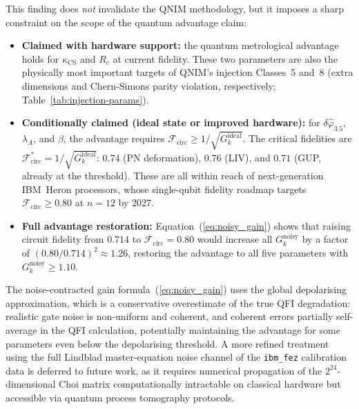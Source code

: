 \documentclass[11pt,a4paper, english]{book}
\theoremstyle{plain}
\theoremstyle{definition}
\numberwithin{equation}{chapter}
\numberwithin{figure}{chapter}
\numberwithin{table}{chapter}
\begin{document}
This finding does \emph{not} invalidate the QNIM methodology, but it
imposes a sharp constraint on the scope of the quantum advantage
claim:
\begin{itemize}
  \item \textbf{Claimed with hardware support:} the quantum metrological
        advantage holds for $\kappa_\mathrm{CS}$ and $R_c$ at current
        fidelity.  These two parameters are also the physically most
        important targets of QNIM's injection Classes~5 and~8 (extra dimensions 
and Chern-Simons parity violation, respectively; 
Table~\ref{tab:injection-params}).

  \item \textbf{Conditionally claimed (ideal state or improved hardware):}
        for $\delta\hat{\varphi}_{3.5}$, $\lambda_A$, and $\beta$, the
        advantage requires $\mathcal{F}_\mathrm{circ} \geq
        1/\sqrt{G_k^\mathrm{ideal}}$.  The critical fidelities are
        $\mathcal{F}_\mathrm{circ}^* = 1/\sqrt{G_k^\mathrm{ideal}}$:
        $0.74$ (PN deformation), $0.76$ (LIV), and $0.71$ (GUP,
        already at the threshold).  These are all within reach of
        next-generation IBM~Heron processors, whose single-qubit fidelity
        roadmap targets $\mathcal{F}_\mathrm{circ} \geq 0.80$ at
        $n=12$ by 2027.

  \item \textbf{Full advantage restoration:}
        Equation~(\ref{eq:noisy_gain}) shows that raising circuit
        fidelity from $0.714$ to $\mathcal{F}_\mathrm{circ} = 0.80$
        would increase all $G_k^\mathrm{noisy}$ by a factor of
        $(0.80/0.714)^2 \approx 1.26$, restoring the advantage to all
        five parameters with $G_k^\mathrm{noisy} \geq 1.10$.
\end{itemize}

The noise-contracted gain formula~(\ref{eq:noisy_gain}) uses the global
depolarising approximation, which is a conservative overestimate of the
true QFI degradation: realistic gate noise is non-uniform and coherent,
and coherent errors partially self-average in the QFI calculation,
potentially maintaining the advantage for some parameters even below
the depolarising threshold.  A more refined treatment using the full
Lindblad master-equation noise channel of the \texttt{ibm\_fez}
calibration data is deferred to future work, as it requires numerical
propagation of the $2^{24}$-dimensional Choi matrix  computationally
intractable on classical hardware but accessible via quantum process
tomography protocols.
\end{document}
